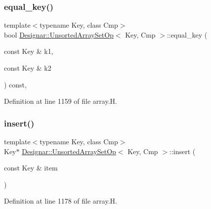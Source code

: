\subsubsection{\texorpdfstring{equal\+\_\+key()}{equal\_key()}}
{\footnotesize\ttfamily template$<$typename Key, class Cmp$>$ \\
bool \hyperlink{class_designar_1_1_unsorted_array_set_op}{Designar\+::\+Unsorted\+Array\+Set\+Op}$<$ Key, Cmp $>$\+::equal\+\_\+key (\begin{DoxyParamCaption}\item[{const Key \&}]{k1,  }\item[{const Key \&}]{k2 }\end{DoxyParamCaption}) const\hspace{0.3cm}{\ttfamily [inline]}, {\ttfamily [protected]}}



Definition at line 1159 of file array.\+H.

\mbox{\label{class_designar_1_1_unsorted_array_set_op_a7e205053bbcef407bdbde7dae628b2a7}} 
\subsubsection{\texorpdfstring{insert()}{insert()}\hspace{0.1cm}{\footnotesize\ttfamily [1/2]}}
{\footnotesize\ttfamily template$<$typename Key, class Cmp$>$ \\
Key$\ast$ \hyperlink{class_designar_1_1_unsorted_array_set_op}{Designar\+::\+Unsorted\+Array\+Set\+Op}$<$ Key, Cmp $>$\+::insert (\begin{DoxyParamCaption}\item[{const Key \&}]{item }\end{DoxyParamCaption})\hspace{0.3cm}{\ttfamily [inline]}}



Definition at line 1178 of file array.\+H.

\mbox{\label{class_designar_1_1_unsorted_array_set_op_aaab3531e6bd3e3044560f3645ce2c529}} 
